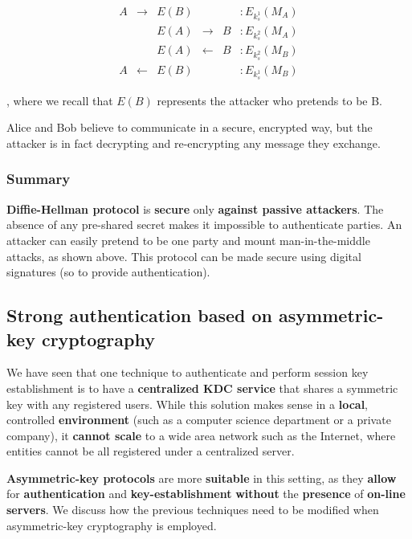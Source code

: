 $$\begin{array}{cccccl} A  & \rightarrow &  E(B) & & &: E_{k_s^1}(M_A)  \\ & & E(A)  & \rightarrow &  B &: E_{k_s^2}(M_A)   \\ & & E(A) & \leftarrow & B &: E_{k_s^2}(M_B)  \\ A & \leftarrow & E(B) & & &: E_{k_s^1}(M_B)  \end{array}$$

, where we recall that $E(B)$ represents the attacker who pretends to be B.

Alice and Bob believe to communicate in a secure, encrypted way, but the attacker is in fact decrypting and re-encrypting any message they exchange.

\subsubsection{Summary}
\textbf{Diffie-Hellman protocol} is \textbf{secure} only \textbf{against passive attackers}. The absence of any pre-shared secret makes it impossible to authenticate parties. An attacker can easily pretend to be one party and mount man-in-the-middle attacks, as shown above. This protocol can be made secure using digital signatures (so to provide authentication).

\subsection{Strong authentication based on asymmetric-key cryptography}
We have seen that one technique to authenticate and perform session key establishment is to have a \textbf{centralized KDC service} that shares a symmetric key with any registered users. While this solution makes sense in a \textbf{local}, controlled \textbf{environment} (such as a computer science department or a private company), it \textbf{cannot scale} to a wide area network such as the Internet, where entities cannot be all registered under a centralized server.

\textbf{Asymmetric-key protocols} are more \textbf{suitable} in this setting, as they \textbf{allow} for \textbf{authentication} and \textbf{key-establishment} \textbf{without} the \textbf{presence} of \textbf{on-line servers}. We discuss how the previous techniques need to be modified when asymmetric-key cryptography is employed.

